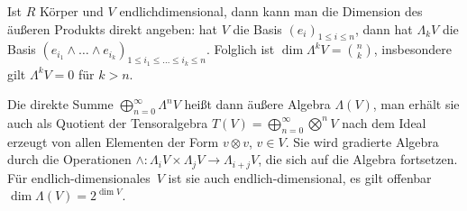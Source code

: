 Ist $R$ Körper und $V$ endlichdimensional, dann kann man die Dimension des äußeren Produkts direkt angeben: hat $V$ die Basis $(e_i)_{1 \leq i \leq n}$, dann hat $\Lambda_k V$ die Basis $(e_{i_1} \wedge \dots \wedge e_{i_k})_{1 \leq i_1 \leq \dots \leq i_k \leq n}$. Folglich ist $\dim \Lambda^k V = \binom nk$, insbesondere gilt $\Lambda^k V = 0$ für $k > n$.

Die direkte Summe $\bigoplus_{n=0}^\infty \Lambda^n V$ heißt dann äußere Algebra $\Lambda(V)$, man erhält sie auch als Quotient der Tensoralgebra $T(V) = \bigoplus_{n=0}^\infty \bigotimes^n V$ nach dem Ideal erzeugt von allen Elementen der Form $v \otimes v$, $v \in V$. Sie wird gradierte Algebra durch die Operationen $\wedge: \Lambda_i V \times \Lambda_j V \to \Lambda_{i+j} V$, die sich auf die Algebra fortsetzen. Für endlich-dimensionales~$V$ ist sie auch endlich-dimensional, es gilt offenbar $\dim \Lambda(V) = 2^{\dim V}$.

